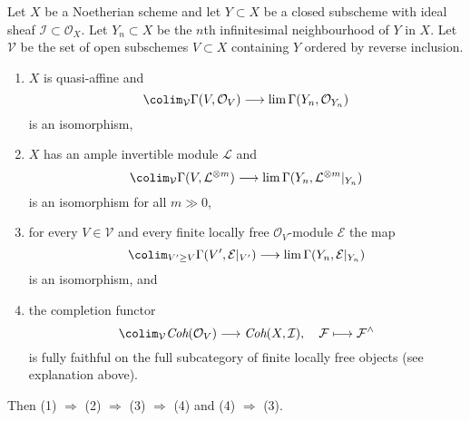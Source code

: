\begin{lemma}
\label{lemma-completion-fully-faithful-general}
Let $X$ be a Noetherian scheme and let $Y \subset X$ be a closed subscheme
with ideal sheaf $\mathcal{I} \subset \mathcal{O}_X$.
Let $Y_n \subset X$ be the $n$th infinitesimal neighbourhood of $Y$ in $X$.
Let $\mathcal{V}$ be the set of open subschemes $V \subset X$ containing $Y$
ordered by reverse inclusion.
\begin{enumerate}
\item $X$ is quasi-affine and
$$
\colim_\mathcal{V} \Gamma(V, \mathcal{O}_V)
\longrightarrow
\lim \Gamma(Y_n, \mathcal{O}_{Y_n})
$$
is an isomorphism,
\item $X$ has an ample invertible module $\mathcal{L}$ and
$$
\colim_\mathcal{V} \Gamma(V, \mathcal{L}^{\otimes m})
\longrightarrow
\lim \Gamma(Y_n, \mathcal{L}^{\otimes m}|_{Y_n})
$$
is an isomorphism for all $m \gg 0$,
\item for every $V \in \mathcal{V}$ and every finite locally free
$\mathcal{O}_V$-module $\mathcal{E}$ the map
$$
\colim_{V' \geq V} \Gamma(V', \mathcal{E}|_{V'})
\longrightarrow
\lim \Gamma(Y_n, \mathcal{E}|_{Y_n})
$$
is an isomorphism, and
\item the completion functor
$$
\colim_\mathcal{V} \textit{Coh}(\mathcal{O}_V)
\longrightarrow
\textit{Coh}(X, \mathcal{I}),
\quad
\mathcal{F} \longmapsto \mathcal{F}^\wedge
$$
is fully faithful on the full subcategory of
finite locally free objects (see explanation above).
\end{enumerate}
Then (1) $\Rightarrow$ (2) $\Rightarrow$ (3) $\Rightarrow$ (4)
and (4) $\Rightarrow$ (3).
\end{lemma}

